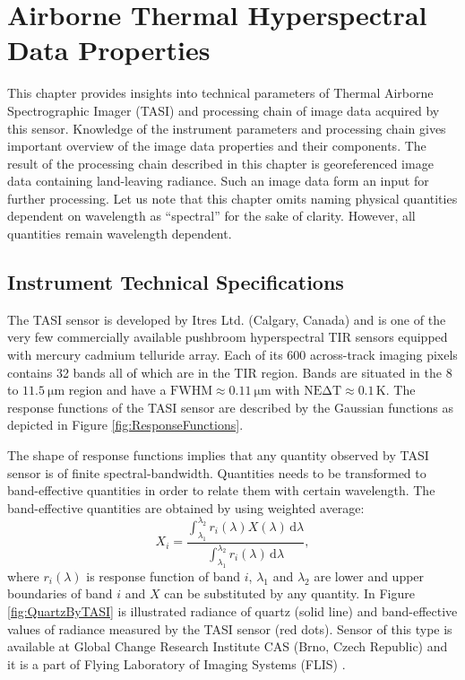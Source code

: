\chapter{Airborne Thermal Hyperspectral Data Properties}
\label{chap:Data}

This chapter provides insights into technical parameters of Thermal Airborne Spectrographic Imager (TASI) and processing chain of image data acquired by this sensor. Knowledge of the instrument parameters and processing chain gives important overview of the image data properties and their components. The result of the processing chain described in this chapter is georeferenced image data containing land-leaving radiance. Such an image data form an input for further processing. Let us note that this chapter omits naming physical quantities dependent on wavelength as ``spectral'' for the sake of clarity. However, all quantities remain wavelength dependent.

\section{Instrument Technical Specifications}

The TASI sensor is developed by Itres Ltd. (Calgary, Canada) and is one of the very few commercially available pushbroom hyperspectral TIR sensors equipped with mercury cadmium telluride array. Each of its 600 across-track imaging pixels contains 32 bands all of which are in the TIR region. Bands are situated in the 8 to $\SI{11.5}{\micro\meter}$ region and have a $\mathrm{FWHM} \approx \SI{0.11}{\micro\meter}$ with $\mathrm{NE\Delta T} \approx 0.1\,\mathrm{K}$. The response functions of the TASI sensor are described by the Gaussian functions as depicted in Figure \ref{fig:ResponseFunctions}. 

The shape of response functions implies that any quantity observed by TASI sensor is of finite spectral-bandwidth. Quantities needs to be transformed to band-effective quantities in order to relate them with certain wavelength. The band-effective quantities are obtained by using weighted average:
\begin{equation}
	X_i = \frac{\int_{\lambda_1}^{\lambda_2} r_i(\lambda) X(\lambda) \,\mathrm{d}\lambda}{\int_{\lambda_1}^{\lambda_2} r_i(\lambda)\,\mathrm{d}\lambda},
	\label{eq:weightedAverage}
\end{equation}
where $r_i(\lambda)$ is response function of band $i$, $\lambda_1$ and $\lambda_2$ are lower and upper boundaries of band $i$ and $X$ can be substituted by any quantity. In Figure \ref{fig:QuartzByTASI} is illustrated radiance of quartz (solid line) and band-effective values of radiance measured by the TASI sensor (red dots). Sensor of this type is available at Global Change Research Institute CAS (Brno, Czech Republic) and it is a part of Flying Laboratory of Imaging Systems (FLIS) \cite{HF14}.

